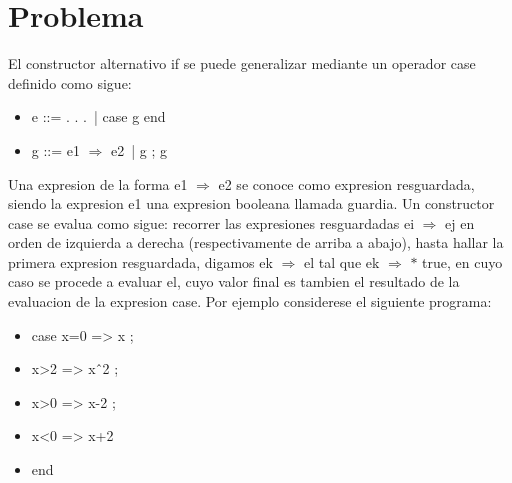 \documentclass{article}
\begin{document}
    \section{Problema}
    El constructor alternativo if se puede generalizar mediante un operador case definido como sigue:

        \begin{itemize}
            \item[ ] e ::= . . . \,| case g end
            \item[ ] g ::= e1 $\Rightarrow$ e2 \,| g ; g 
        \end{itemize}

    Una expresion de la forma e1 $\Rightarrow$ e2 se conoce como expresion resguardada, siendo la expresion e1 una expresion booleana llamada guardia. Un constructor case se evalua como sigue: recorrer las expresiones resguardadas ei $\Rightarrow$ ej en orden de izquierda a derecha (respectivamente de arriba a abajo), hasta hallar la primera expresion resguardada, digamos ek $\Rightarrow$ el tal que ek $\Rightarrow$ $*$ true, en cuyo caso se procede a evaluar el, cuyo valor final es tambien el resultado de la evaluacion de la expresion case. Por ejemplo considerese el siguiente programa:

        \begin{itemize}
            \item[ ] case x=0 => x ;
            \item[ ] x>2 => xˆ2 ;
            \item[ ] x>0 => x-2 ;
            \item[ ] x<0 => x+2
            \item[ ] end
        \end{itemize}
\end{document}
